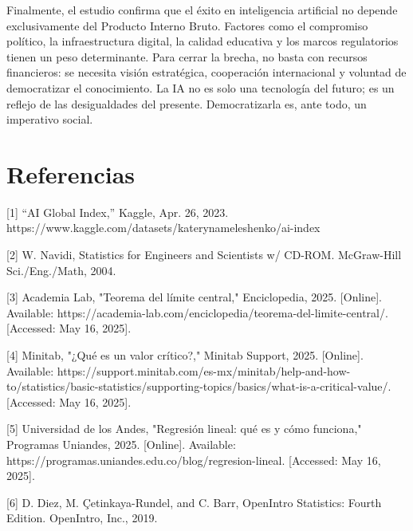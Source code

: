 \documentclass[
]{article}
\begin{document}
\begin{multicols}{2}
Finalmente, el estudio confirma que el éxito en inteligencia artificial no depende exclusivamente del Producto Interno Bruto. Factores como el compromiso político, la infraestructura digital, la calidad educativa y los marcos regulatorios tienen un peso determinante. Para cerrar la brecha, no basta con recursos financieros: se necesita visión estratégica, cooperación internacional y voluntad de democratizar el conocimiento. La IA no es solo una tecnología del futuro; es un reflejo de las desigualdades del presente. Democratizarla es, ante todo, un imperativo social.

\section{Referencias}
[1]   “AI Global Index,” Kaggle, Apr. 26, 2023.         https://www.kaggle.com/datasets/katerynameleshenko/ai-index

[2]   W. Navidi, Statistics for Engineers and Scientists w/ CD-ROM. McGraw-Hill Sci./Eng./Math, 2004.

[3] Academia Lab, "Teorema del límite central," Enciclopedia, 2025. [Online]. Available: https://academia-lab.com/enciclopedia/teorema-del-limite-central/. [Accessed: May 16, 2025].

[4] Minitab, "¿Qué es un valor crítico?," Minitab Support, 2025. [Online]. Available: https://support.minitab.com/es-mx/minitab/help-and-how-to/statistics/basic-statistics/supporting-topics/basics/what-is-a-critical-value/. [Accessed: May 16, 2025].

[5] Universidad de los Andes, "Regresión lineal: qué es y cómo funciona," Programas Uniandes, 2025. [Online]. Available: https://programas.uniandes.edu.co/blog/regresion-lineal. [Accessed: May 16, 2025].

[6] D. Diez, M. Çetinkaya-Rundel, and C. Barr, OpenIntro Statistics: Fourth Edition. OpenIntro, Inc., 2019.


\end{multicols}
\end{document}
